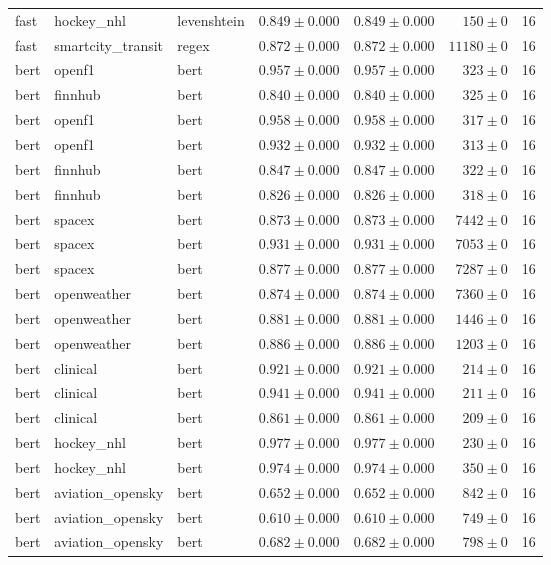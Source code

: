 \begin{table}[htbp]
\begin{tabular}{l l l r r r r}
fast & hockey\_nhl & levenshtein & $0.849\pm0.000$ & $0.849\pm0.000$ & $150\pm0$ & 16 \\
fast & smartcity\_transit & regex & $0.872\pm0.000$ & $0.872\pm0.000$ & $11180\pm0$ & 16 \\
bert & openf1 & bert & $0.957\pm0.000$ & $0.957\pm0.000$ & $323\pm0$ & 16 \\
bert & finnhub & bert & $0.840\pm0.000$ & $0.840\pm0.000$ & $325\pm0$ & 16 \\
bert & openf1 & bert & $0.958\pm0.000$ & $0.958\pm0.000$ & $317\pm0$ & 16 \\
bert & openf1 & bert & $0.932\pm0.000$ & $0.932\pm0.000$ & $313\pm0$ & 16 \\
bert & finnhub & bert & $0.847\pm0.000$ & $0.847\pm0.000$ & $322\pm0$ & 16 \\
bert & finnhub & bert & $0.826\pm0.000$ & $0.826\pm0.000$ & $318\pm0$ & 16 \\
bert & spacex & bert & $0.873\pm0.000$ & $0.873\pm0.000$ & $7442\pm0$ & 16 \\
bert & spacex & bert & $0.931\pm0.000$ & $0.931\pm0.000$ & $7053\pm0$ & 16 \\
bert & spacex & bert & $0.877\pm0.000$ & $0.877\pm0.000$ & $7287\pm0$ & 16 \\
bert & openweather & bert & $0.874\pm0.000$ & $0.874\pm0.000$ & $7360\pm0$ & 16 \\
bert & openweather & bert & $0.881\pm0.000$ & $0.881\pm0.000$ & $1446\pm0$ & 16 \\
bert & openweather & bert & $0.886\pm0.000$ & $0.886\pm0.000$ & $1203\pm0$ & 16 \\
bert & clinical & bert & $0.921\pm0.000$ & $0.921\pm0.000$ & $214\pm0$ & 16 \\
bert & clinical & bert & $0.941\pm0.000$ & $0.941\pm0.000$ & $211\pm0$ & 16 \\
bert & clinical & bert & $0.861\pm0.000$ & $0.861\pm0.000$ & $209\pm0$ & 16 \\
bert & hockey\_nhl & bert & $0.977\pm0.000$ & $0.977\pm0.000$ & $230\pm0$ & 16 \\
bert & hockey\_nhl & bert & $0.974\pm0.000$ & $0.974\pm0.000$ & $350\pm0$ & 16 \\
bert & aviation\_opensky & bert & $0.652\pm0.000$ & $0.652\pm0.000$ & $842\pm0$ & 16 \\
bert & aviation\_opensky & bert & $0.610\pm0.000$ & $0.610\pm0.000$ & $749\pm0$ & 16 \\
bert & aviation\_opensky & bert & $0.682\pm0.000$ & $0.682\pm0.000$ & $798\pm0$ & 16 \\

\end{tabular}
\end{table}
